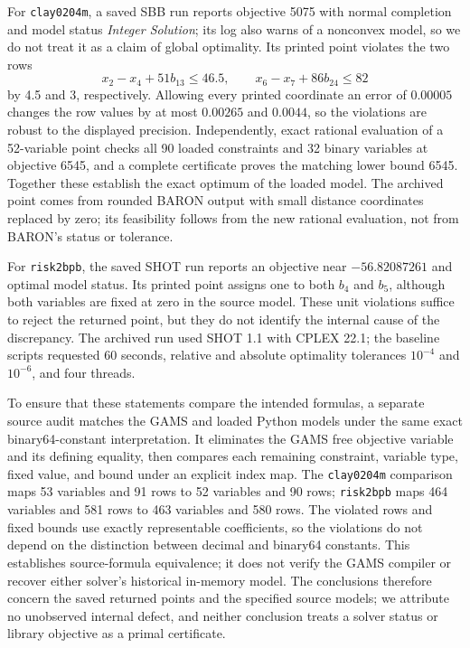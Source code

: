 For \texttt{clay0204m}, a saved SBB run reports objective 5075 with normal
completion and model status \emph{Integer Solution}; its log also warns of a
nonconvex model, so we do not treat it as a claim of global optimality. Its
printed point violates the two rows
\[
 x_2-x_4+51b_{13}\le46.5,\qquad
 x_6-x_7+86b_{24}\le82
\]
by 4.5 and 3, respectively. Allowing every printed coordinate an error of
$0.00005$ changes the row values by at most $0.00265$ and $0.0044$, so the
violations are robust to the displayed precision.
Independently, exact rational evaluation of a 52-variable point checks all
90 loaded constraints and 32 binary variables at objective 6545, and a
complete certificate proves the matching lower bound 6545. Together these
establish the exact optimum of the loaded model. The archived point comes from
rounded BARON output with small distance coordinates replaced by zero;
its feasibility follows from the new rational evaluation, not from BARON's
status or tolerance.

For \texttt{risk2bpb}, the saved SHOT run reports an objective near
$-56.82087261$ and optimal model status. Its printed point assigns one to both
$b_4$ and $b_5$, although both variables are fixed at zero in the source model.
These unit violations suffice to reject the returned point, but they do not
identify the internal cause of the discrepancy. The archived run used SHOT
1.1 with CPLEX 22.1; the baseline scripts requested 60 seconds, relative and
absolute optimality tolerances $10^{-4}$ and $10^{-6}$, and four threads.

To ensure that these statements compare the intended formulas, a separate
source audit matches the GAMS and loaded Python models under the same exact
binary64-constant interpretation. It eliminates the GAMS free objective
variable and its defining equality, then compares each remaining constraint,
variable type, fixed value, and bound under an explicit index map. The
\texttt{clay0204m} comparison maps 53 variables and 91 rows to 52 variables
and 90 rows; \texttt{risk2bpb} maps 464 variables and 581 rows to 463 variables
and 580 rows. The violated rows and fixed bounds use exactly representable
coefficients, so the violations do not depend on the distinction between
decimal and binary64 constants. This establishes source-formula equivalence;
it does not verify the GAMS compiler or recover either solver's historical
in-memory model. The conclusions therefore concern the saved returned points
and the specified source models; we attribute no unobserved internal defect,
and neither conclusion treats a solver status or library objective as a
primal certificate.

